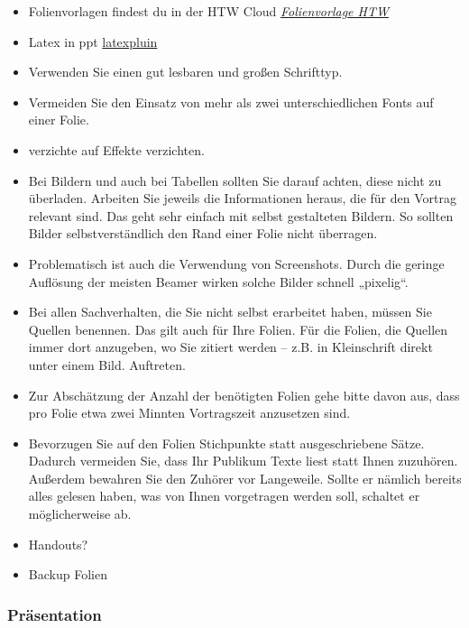 \begin{itemize}
    \item Folienvorlagen findest du in der HTW Cloud \hyperlink{
https://corporatedesign.htw-berlin.de/musterdokumente/powerpoint-vorlagen/}{\emph{Folienvorlage HTW}} 
\item Latex in ppt
\hyperlink{http://www.jonathanleroux.org/software/iguanatex/}{latexpluin}
\item Verwenden Sie einen gut lesbaren und großen Schrifttyp. 
\item Vermeiden Sie den Einsatz von mehr als zwei unterschiedlichen Fonts auf einer Folie.
\item 
verzichte auf Effekte verzichten. 
\item Bei Bildern und auch bei Tabellen sollten Sie darauf achten, diese nicht zu überladen. Arbeiten Sie jeweils die Informationen heraus, die für den Vortrag relevant sind. Das geht sehr einfach mit selbst gestalteten Bildern.  So sollten Bilder selbstverständlich den Rand einer Folie nicht überragen. 
\item Problematisch ist auch die Verwendung von Screenshots. Durch die geringe Auflösung der meisten Beamer wirken solche Bilder schnell „pixelig“. 
\item Bei allen Sachverhalten, die Sie nicht selbst erarbeitet haben, müssen Sie Quellen benennen. Das gilt auch für Ihre Folien. Für die Folien, die Quellen immer dort anzugeben, wo Sie zitiert werden – z.B. in Kleinschrift direkt unter einem Bild. Auftreten. 
\item Zur Abschätzung der Anzahl der benötigten Folien gehe bitte davon aus, dass pro Folie etwa zwei Minnten Vortragszeit anzusetzen sind.
 \item Bevorzugen Sie auf den Folien Stichpunkte statt ausgeschriebene Sätze. Dadurch vermeiden Sie, dass Ihr Publikum Texte liest statt Ihnen zuzuhören. Außerdem bewahren Sie den Zuhörer vor Langeweile. Sollte er nämlich bereits alles gelesen haben, was von Ihnen vorgetragen werden soll, schaltet er möglicherweise ab.
 \item Handouts?
 \item Backup Folien
\end{itemize}

\subsubsection{Präsentation} 

